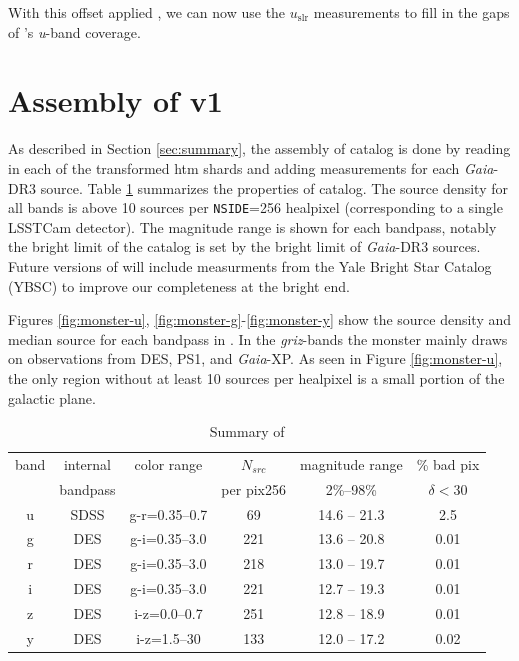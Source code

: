 With this offset applied , we can now use the $u_{\mathrm{slr}}$ measurements to fill in the gaps of \monster's \textit{u}-band coverage.

\section{Assembly of \monster v1}
\label{sec:assembly}
As described in Section \ref{sec:summary}, the assembly of \monster catalog is done by reading in each of the transformed htm shards and adding measurements for each \textit{Gaia}-DR3 source.
Table \ref{tab:summary} summarizes the properties of \monster catalog.
The source density for all bands is above 10 sources per \texttt{NSIDE}=256 healpixel (corresponding to a single LSSTCam detector).
The magnitude range is shown for each bandpass, notably the bright limit of the catalog is set by the bright limit of \emph{Gaia}-DR3 sources.
Future versions of \monster will include measurments from the Yale Bright Star Catalog (YBSC) to improve our completeness at the bright end.

Figures \ref{fig:monster-u}, \ref{fig:monster-g}-\ref{fig:monster-y} show the source density and median source for each bandpass in \monster.
In the \emph{griz}-bands the monster mainly draws on observations from DES, PS1, and \emph{Gaia}-XP.
As seen in Figure \ref{fig:monster-u}, the only region without at least 10 sources per healpixel is a small portion of the galactic plane. 

\begin{table}[htbp]
    \centering
    \label{tab:summary}
    
    \begin{tabular}{|c | c | c | c | c | c |}
        \hline
        band & internal & color range & $N_{src}$  & magnitude range & \% bad pix\\
             & bandpass &             & per pix256 &  2\%--98\%         &$\delta < 30$\\
        \hline
        u             &  SDSS                      & g-r=0.35--0.7        & 69                      & 14.6 -- 21.3   &  2.5  \\
        g             & DES                        & g-i=0.35--3.0        & 221                     & 13.6 -- 20.8   &  0.01 \\
        r             & DES                        & g-i=0.35--3.0        & 218                     & 13.0 -- 19.7   &  0.01 \\
        i             & DES                        & g-i=0.35--3.0        & 221                     & 12.7 -- 19.3   &  0.01 \\
        z             & DES                        & i-z=0.0--0.7         & 251                     & 12.8 -- 18.9   &  0.01 \\
        y             & DES                        & i-z=1.5--30          & 133                     & 12.0 -- 17.2   &  0.02 \\
        \hline
    \end{tabular}
    \caption{Summary of \monster}
\end{table}


